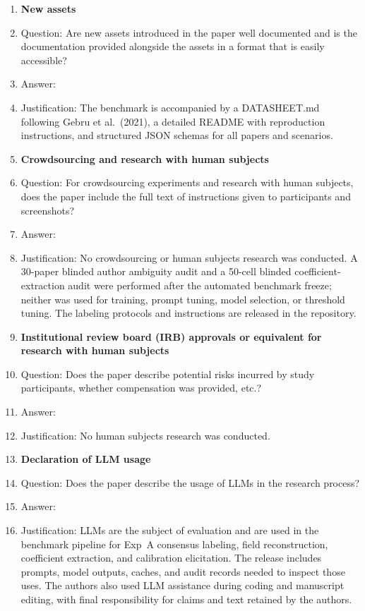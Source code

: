 \begin{enumerate}
\item {\bf New assets}
    \item[] Question: Are new assets introduced in the paper well documented and is the documentation provided alongside the assets in a format that is easily accessible?
    \item[] Answer: \answerYes{}
    \item[] Justification: The benchmark is accompanied by a DATASHEET.md following Gebru et al.\ (2021), a detailed README with reproduction instructions, and structured JSON schemas for all papers and scenarios.

\item {\bf Crowdsourcing and research with human subjects}
    \item[] Question: For crowdsourcing experiments and research with human subjects, does the paper include the full text of instructions given to participants and screenshots?
    \item[] Answer: \answerNA{}
\item[] Justification: No crowdsourcing or human subjects research was conducted. A 30-paper blinded author ambiguity audit and a 50-cell blinded coefficient-extraction audit were performed after the automated benchmark freeze; neither was used for training, prompt tuning, model selection, or threshold tuning. The labeling protocols and instructions are released in the repository.

\item {\bf Institutional review board (IRB) approvals or equivalent for research with human subjects}
    \item[] Question: Does the paper describe potential risks incurred by study participants, whether compensation was provided, etc.?
    \item[] Answer: \answerNA{}
    \item[] Justification: No human subjects research was conducted.

\item {\bf Declaration of LLM usage}
    \item[] Question: Does the paper describe the usage of LLMs in the research process?
    \item[] Answer: \answerYes{}
    \item[] Justification: LLMs are the subject of evaluation and are used in the benchmark pipeline for Exp~A consensus labeling, field reconstruction, coefficient extraction, and calibration elicitation. The release includes prompts, model outputs, caches, and audit records needed to inspect those uses. The authors also used LLM assistance during coding and manuscript editing, with final responsibility for claims and text retained by the authors.

\end{enumerate}
